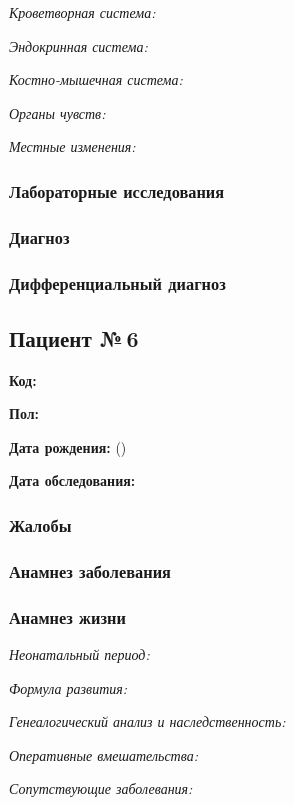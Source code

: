 \documentclass[a4paper,14pt]{extarticle}
\begin{document}
\emph{Кроветворная система:}

\emph{Эндокринная система:}

\emph{Костно-мышечная система:}

\emph{Органы чувств:}

\emph{Местные изменения:}

\subsubsection*{Лабораторные исследования}

\subsubsection*{Диагноз}

\subsubsection*{Дифференциальный диагноз}

\newpage
\subsection*{Пациент №\,6}

\textbf{Код:} 

\textbf{Пол:}

\textbf{Дата рождения:}  ()

\textbf{Дата обследования:} 

\subsubsection*{Жалобы}

\subsubsection*{Анамнез заболевания}

\subsubsection*{Анамнез жизни}

\emph{Неонатальный период:}

\emph{Формула развития:}

\emph{Генеалогический анализ и наследственность:}

\emph{Оперативные вмешательства:}

\emph{Сопутствующие заболевания:}
\end{document}
